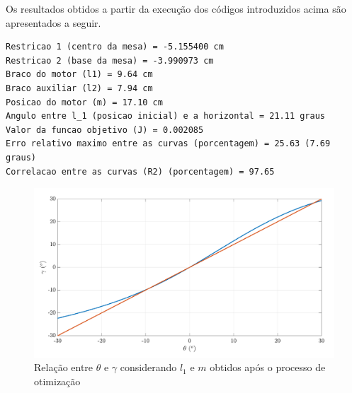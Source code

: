 \documentclass[12pt]{article}
\begin{document}
	\vspace{0.4cm}
	Os resultados obtidos a partir da execução dos códigos introduzidos acima são apresentados a seguir.
	
\begin{lstlisting}
Restricao 1 (centro da mesa) = -5.155400 cm 
Restricao 2 (base da mesa) = -3.990973 cm 
Braco do motor (l1) = 9.64 cm 
Braco auxiliar (l2) = 7.94 cm 
Posicao do motor (m) = 17.10 cm 
Angulo entre l_1 (posicao inicial) e a horizontal = 21.11 graus
Valor da funcao objetivo (J) = 0.002085 
Erro relativo maximo entre as curvas (porcentagem) = 25.63 (7.69 graus)
Correlacao entre as curvas (R2) (porcentagem) = 97.65 
\end{lstlisting}
	
	\begin{figure}[H]
		\centering
		\includegraphics[width=\linewidth]{figuras/bracoOtimizado.pdf}
		\caption{Relação entre $ \theta $ e $ \gamma $ considerando $ l_1 $ e $ m $ obtidos após o processo de otimização}
		\label{bracoOtimizado}
	\end{figure}
\end{document}
